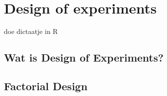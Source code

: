 \chapter{Design of experiments}
doe dictaatje in R

\section{Wat is Design of Experiments?}
\section{Factorial Design}